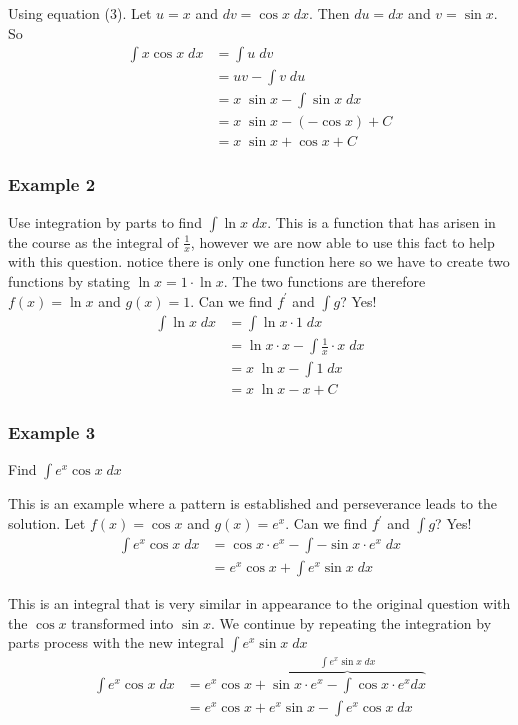 Using equation (3). Let $u =x$ and $d v =\cos  x\; d x$. Then $d u =d x$ and $v =\sin  x$. So
\begin{align*}\int x \cos  x\; d x &  = \int u\; d v \\
 &  = u v -\int v\; d u \\
 &  = x\; \sin  x -\int \sin  x\; d x \\
 &  = x\; \sin  x -\left ( -\cos  x\right ) +C \\
 &  = x\; \sin  x +\cos  x +C\end{align*}

\subsubsection{Example 2}
Use integration by parts to find $\int \ln  x\; d x$. This is a function that has arisen in the course as the integral of $\frac{1}{x}$, however we are now able to use this fact to help with this question. notice there is only one function here so we have to create
two functions by stating $\ln  x =1 \cdot \ln  x$. The two functions are therefore $f (x) =\ln  x$ and $g (x) =1$. Can we find $f^{ \prime }$ and $\int g$? Yes!
\begin{align*}\int \ln  x\; d x &  = \int \ln  x \cdot 1\; d x \\
 &  = \ln  x \cdot x -\int \frac{1}{x} \cdot x\; d x \\
 &  = x\; \ln  x -\int 1\; d x \\
 &  = x\; \ln  x -x +C\end{align*}

\subsubsection{Example 3}
Find $\int e^{x} \cos  x\; d x$ 

This is an example where a pattern is established and perseverance leads to the solution. Let
$f (x) =\cos  x$ and $g (x) =e^{x}$. Can we find $f^{ \prime }$ and $\int g$? Yes!
\begin{align*}\int e^{x} \cos  x\; d x &  = \cos  x \cdot e^{x} -\int  -\sin  x \cdot e^{x}\; d x \\
 &  = e^{x} \cos  x +\int e^{x} \sin  x\; d x\end{align*}

This is an integral that is very similar in appearance to the original question with the $\cos  x$ transformed into $\sin  x$. We continue by repeating the integration by parts process with the new integral
$\int e^{x} \sin  x\; d x$
\begin{align*}\int e^{x} \cos  x\; d x &  = e^{x} \cos  x +\overset{\int e^{x} \sin  x\; d x}{\overbrace{\sin  x \cdot e^{x} -\int \cos  x \cdot e^{x} d x}} \\
 &  = e^{x} \cos  x +e^{x} \sin  x -\int e^{x} \cos  x\; d x\end{align*}

